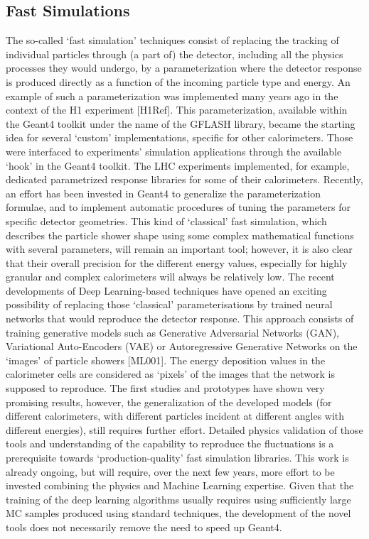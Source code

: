 \documentclass[11pt,a4paper]{article}
\begin{document}
\hypertarget{fast-simulations}{%
\subsection{Fast Simulations}\label{fast-simulations}}

The so-called `fast simulation' techniques consist of replacing the
tracking of individual particles through (a part of) the detector,
including all the physics processes they would undergo, by a
parameterization where the detector response is produced directly as a
function of the incoming particle type and energy. An example of such a
parameterization was implemented many years ago in the context of the H1
experiment {[}H1Ref{]}. This parameterization, available within the
Geant4 toolkit under the name of the GFLASH library, became the starting
idea for several `custom' implementations, specific for other
calorimeters. Those were interfaced to experiments' simulation
applications through the available `hook' in the Geant4 toolkit. The LHC
experiments implemented, for example, dedicated parametrized response
libraries for some of their calorimeters. Recently, an effort has been
invested in Geant4 to generalize the parameterization formulae, and to
implement automatic procedures of tuning the parameters for specific
detector geometries. This kind of `classical' fast simulation, which
describes the particle shower shape using some complex mathematical
functions with several parameters, will remain an important tool;
however, it is also clear that their overall precision for the different
energy values, especially for highly granular and complex calorimeters
will always be relatively low. The recent developments of Deep
Learning-based techniques have opened an exciting possibility of
replacing those `classical' parameterisations by trained neural networks
that would reproduce the detector response. This approach consists of
training generative models such as Generative Adversarial Networks
(GAN), Variational Auto-Encoders (VAE) or Autoregressive Generative
Networks on the `images' of particle showers {[}ML001{]}. The energy
deposition values in the calorimeter cells are considered as `pixels' of
the images that the network is supposed to reproduce. The first studies
and prototypes have shown very promising results, however, the
generalization of the developed models (for different calorimeters, with
different particles incident at different angles with different
energies), still requires further effort. Detailed physics validation of
those tools and understanding of the capability to reproduce the
fluctuations is a prerequisite towards `production-quality' fast
simulation libraries. This work is already ongoing, but will require,
over the next few years, more effort to be invested combining the
physics and Machine Learning expertise. Given that the training of the
deep learning algorithms usually requires using sufficiently large MC
samples produced using standard techniques, the development of the novel
tools does not necessarily remove the need to speed up Geant4.
\end{document}
